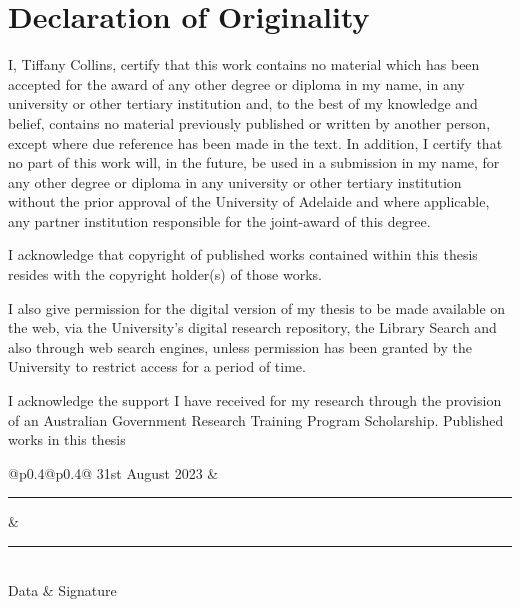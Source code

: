 \chapter{Declaration of Originality}

I, Tiffany Collins, certify that this work contains no material which has been accepted for the award of any other degree or diploma in my name, in any university or other tertiary institution and, to the best of my knowledge and belief, contains no material previously published or written by another person, except where due reference has been made in the text. In addition, I certify that no part of this work will, in the future, be used in a submission in my name, for any other degree or diploma in any university or other tertiary institution without the prior approval of the University of Adelaide and where applicable, any partner institution responsible for the joint-award of this degree.
\par
\noindent I acknowledge that copyright of published works contained within this thesis resides with the copyright holder(s) of those works.
\par
\noindent I also give permission for the digital version of my thesis to be made available on the web, via the University’s digital research
repository, the Library Search and also through web search engines, unless permission has been granted by the University to restrict access for a period of time.
\par
\noindent I acknowledge the support I have received for my research through the provision of an Australian Government Research Training
Program Scholarship.
\newpar
\noindent Published works in this thesis
\newpar
\noindent {}








\vspace{4.0cm}

\begin{tabular}{@{}p{0.4\textwidth}@{\hspace{0.15\textwidth}}p{0.4\textwidth}@{}}
	31st August 2023 & \\
	\rule{\linewidth}{0.25pt} & \rule{\linewidth}{0.25pt} \\
	Data & Signature
\end{tabular}